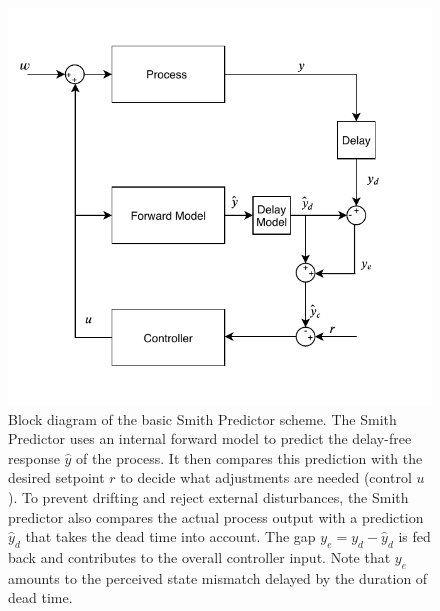 \begin{figure}[h!]
    \centering

    \includegraphics[width=0.6\linewidth]{images/smith.pdf}
    \caption{Block diagram of the basic Smith Predictor scheme. The Smith Predictor uses an internal  forward model  to predict the delay-free response \ensuremath{\hat{y}} of the process. It then compares this prediction  with the desired setpoint \ensuremath{r} to decide what adjustments are needed (control \ensuremath{u}). To prevent drifting and reject external disturbances, the Smith predictor also compares the actual process output with a prediction \ensuremath{\hat{y}_d} that takes the dead time into account. The gap \ensuremath{y_e=y_d-\hat{y}_d} is fed back  and contributes to the overall controller input. Note that \ensuremath{y_e} amounts to the perceived state mismatch delayed by the duration of dead time.}
    \label{fig:smith}
\end{figure}


